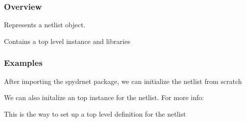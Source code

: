 \documentclass[letterpaper,10pt,english,openany,oneside]{sphinxmanual}
\begin{document}
\subsubsection{Overview}
\label{\detokenize{reference/classes/netlist:overview}}

\begin{fulllineitems}
\label{\detokenize{reference/classes/netlist:spydrnet.Netlist}}
Represents a netlist object.

Contains a top level instance and libraries
\subsubsection*{Examples}

After importing the spydrnet package, we can initialize the netlist from scratch

\begin{sphinxVerbatim}[commandchars=\\\{\}]
   
  
\end{sphinxVerbatim}

We can also initalize an top instance for the netlist. For more info: {\hyperref[\detokenize{reference/classes/instance:instance}]{}}

\begin{sphinxVerbatim}[commandchars=\\\{\}]
  
  
\end{sphinxVerbatim}

This is the way to set up a top level definition for the netlist

\begin{sphinxVerbatim}[commandchars=\\\{\}]
  
  
\end{sphinxVerbatim}


\end{fulllineitems}
\end{document}
